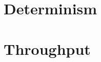 
\section{Determinism}\label{sec:platform-determinism}


\section{Throughput}\label{sec:platform-throughput}

